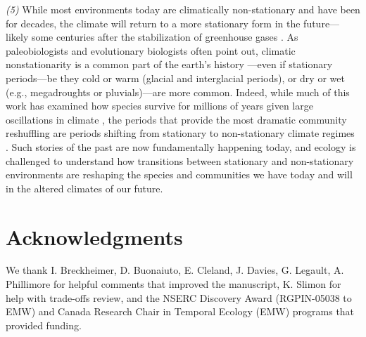 \documentclass[11pt,letterpaper]{article}
\begin{document}
\emph{(5)}  While most environments today are climatically non-stationary and have been for decades, the climate will return to a more stationary form in the future---likely some centuries after the stabilization of greenhouse gases \citep{ipcc2013ch12}. As paleobiologists and evolutionary biologists often point out, climatic nonstationarity is a common part of the earth's history \citep{Jansson:2002nz}---even if stationary periods---be they cold or warm (glacial and interglacial periods), or dry or wet (e.g., megadroughts or pluvials)---are more common. Indeed, while much of this work has examined how species survive for millions of years given large oscillations in climate \citep{provan2008}, the periods that provide the most dramatic community reshuffling are periods shifting from stationary to non-stationary climate regimes \citep{vrba1980,vrba1985}. Such stories of the past are now fundamentally happening today, and ecology is challenged to understand how transitions between stationary and non-stationary environments are reshaping the species and communities we have today and will in the altered climates of our future.


\section{Acknowledgments}
We thank I. Breckheimer, D. Buonaiuto, E. Cleland, J. Davies, G. Legault, A. Phillimore for helpful comments that improved the manuscript, K. Slimon for help with trade-offs review, and the NSERC Discovery Award (RGPIN-05038 to EMW) and Canada Research Chair in Temporal Ecology (EMW) programs that provided funding. 

\end{document}
